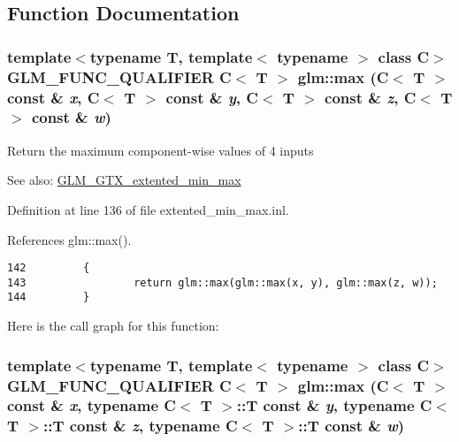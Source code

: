 \subsection{Function Documentation}
\hypertarget{group__gtx__extented__min__max_g56246e6ce859dc617425497eab1bdbd8}{
\subsubsection[max]{\setlength{\rightskip}{0pt plus 5cm}template$<$typename T, template$<$ typename $>$ class C$>$ GLM\_\-FUNC\_\-QUALIFIER C$<$ T $>$ glm::max (C$<$ T $>$ const \& {\em x}, \/  C$<$ T $>$ const \& {\em y}, \/  C$<$ T $>$ const \& {\em z}, \/  C$<$ T $>$ const \& {\em w})}}
\label{group__gtx__extented__min__max_g56246e6ce859dc617425497eab1bdbd8}


Return the maximum component-wise values of 4 inputs \begin{Desc}
\item[See also:]\hyperlink{group__gtx__extented__min__max}{GLM\_\-GTX\_\-extented\_\-min\_\-max} \end{Desc}


Definition at line 136 of file extented\_\-min\_\-max.inl.

References glm::max().

\begin{Code}\begin{verbatim}142         {
143                 return glm::max(glm::max(x, y), glm::max(z, w));
144         }
\end{verbatim}
\end{Code}




Here is the call graph for this function:\hypertarget{group__gtx__extented__min__max_gad13af3c32f9a925e4ef4276bcf37ab7}{
\subsubsection[max]{\setlength{\rightskip}{0pt plus 5cm}template$<$typename T, template$<$ typename $>$ class C$>$ GLM\_\-FUNC\_\-QUALIFIER C$<$ T $>$ glm::max (C$<$ T $>$ const \& {\em x}, \/  typename C$<$ T $>$::T const \& {\em y}, \/  typename C$<$ T $>$::T const \& {\em z}, \/  typename C$<$ T $>$::T const \& {\em w})}}
\label{group__gtx__extented__min__max_gad13af3c32f9a925e4ef4276bcf37ab7}


